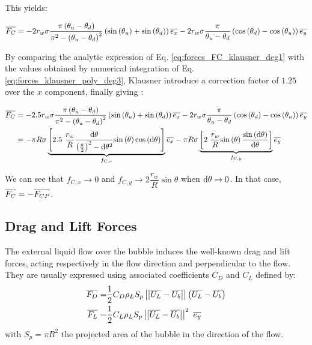 This yields:

\begin{equation}
\overline{F_{C}}=-2r_{w}\sigma \frac{\pi\left( \theta_{u}-\theta_{d} \right)}{\pi^{2}-\left( \theta_{u}-\theta_{d} \right)^{2}}\left( \mathrm{sin}\left( \theta_{u} \right)+\mathrm{sin}\left( \theta_{d} \right)  \right)\overline{e_{x}} - 2r_{w} \sigma \frac{\pi}{\theta_{u}-\theta_{d}}\left( \mathrm{cos}\left( \theta_{d} \right)- \mathrm{cos}\left( \theta_{u} \right) \right)\overline{e_{y}}
\label{eq:forces_FC_klausner_deg1}
\end{equation}

By comparing the analytic expression of Eq. \ref{eq:forces_FC_klausner_deg1} with the values obtained by numerical integration of Eq.\ref{eq:forces_klausner_poly_deg3}, Klausner \etal introduce a correction factor of $1.25$ over the $x$ component, finally giving :

\begin{align}
\vect{F_{C}}&=-2.5r_{w}\sigma \frac{\pi\parth{\theta_{u}-\theta_{d}}}{\pi^{2}-\parth{\theta_{u}-\theta_{d}}^{2}}\parth{\sin{\theta_{u}}+\sin{\theta_{d}} }\vect{e_{x}} - 2r_{w} \sigma \frac{\pi}{\theta_{u}-\theta_{d}}\parth{\cos{\theta_{d}}- \cos{\theta_{u}}}\vect{e_{y}}\\
%
&=-\pi R \sigma \underbrace{\crocht{2.5~ \frac{r_{w}}{R} \frac{\dtheta}{\parth{\frac{\pi}{2}}^{2}-\dtheta^{2}}\sin{\theta}\cos{\dtheta}}}_{f_{C,x}} \vect{e_{x}} - \pi R \sigma \underbrace{\crocht{2\ \frac{r_{w}}{R} \sin{\theta} \frac{\sin{\dtheta}}{\dtheta}}}_{f_{C,y}} \vect{e_{y}}
\label{eq:forces_FC}
\end{align}

\begin{remark*}{}
We can see that $f_{C,x} \to 0$ and $f_{C,y} \to 2\dfrac{r_{w}}{R}\sin{\theta}$  when $\mathrm{d}\theta \to 0$. In that case, $\overline{F_{C}} = -\overline{F_{CP}}$.
\end{remark*}





\subsection{Drag and Lift Forces}
\label{subsec:drag_lift}


The external liquid flow over the bubble induces the well-known drag and lift forces, acting respectively in the flow direction and perpendicular to the flow. They are usually expressed using associated coefficients $C_{D}$ and $C_{L}$ defined by:
\begin{align}
\overline{F_{D}}=&\frac{1}{2}C_{D}\rho_{L}S_{p} \left|\left|{ \overline{U_{L}}-\overline{U_{b}} }\right|\right| \left( \overline{U_{L}}-\overline{U_{b}} \right) \\
\overline{F_{L}}=&\frac{1}{2}C_{L}\rho_{L}S_{p}\left|\left|{\overline{U_{L}}-\overline{U_{b}}}\right|\right|^{2}\ \overline{e_{y}}
\end{align}
with $S_{p}=\pi R^{2}$ the projected area of the bubble in the direction of the flow.

